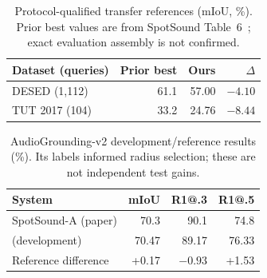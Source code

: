 \begin{table}[t]
\centering
\caption{Protocol-qualified transfer references (mIoU, \%). Prior best values are from SpotSound Table~6~\cite{sun2026spotsound}; exact evaluation assembly is not confirmed.}
\label{tab:transfer}
\small
\setlength{\tabcolsep}{5pt}
\begin{tabular}{@{}lrrr@{}}
\toprule
Dataset (queries) & Prior best & Ours & $\Delta$\\
\midrule
DESED (1,112) & 61.1 & 57.00 & $-4.10$\\
TUT 2017 (104) & 33.2 & 24.76 & $-8.44$\\
\bottomrule
\end{tabular}
\end{table}

\begin{table}[t]
\centering
\caption{AudioGrounding-v2 development/reference results (\%). Its labels informed radius selection; these are not independent test gains.}
\label{tab:development}
\small
\setlength{\tabcolsep}{5pt}
\begin{tabular}{@{}lrrr@{}}
\toprule
System & mIoU & R1@.3 & R1@.5\\
\midrule
SpotSound-A (paper) & 70.3 & 90.1 & 74.8\\
\NOVA{} (development) & 70.47 & 89.17 & 76.33\\
Reference difference & +0.17 & $-0.93$ & +1.53\\
\bottomrule
\end{tabular}
\end{table}
